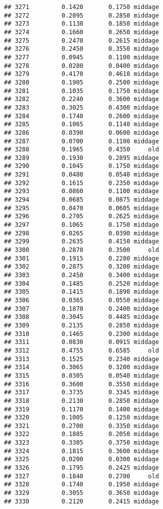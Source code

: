 \documentclass[
]{article}
\begin{document}
\begin{verbatim}
## 3271         0.1420       0.1750 middage
## 3272         0.2095       0.2850 middage
## 3273         0.1130       0.1850 middage
## 3274         0.1660       0.2650 middage
## 3275         0.2470       0.2615 middage
## 3276         0.2450       0.3550 middage
## 3277         0.0945       0.1100 middage
## 3278         0.0280       0.0400 middage
## 3279         0.4170       0.4610 middage
## 3280         0.1905       0.2500 middage
## 3281         0.1035       0.1750 middage
## 3282         0.2240       0.3600 middage
## 3283         0.3025       0.4300 middage
## 3284         0.1740       0.2600 middage
## 3285         0.1065       0.1140 middage
## 3286         0.0390       0.0600 middage
## 3287         0.0700       0.1100 middage
## 3288         0.1965       0.4350     old
## 3289         0.1930       0.2895 middage
## 3290         0.1045       0.1750 middage
## 3291         0.0480       0.0540 middage
## 3292         0.1615       0.2350 middage
## 3293         0.0860       0.1100 middage
## 3294         0.0685       0.0875 middage
## 3295         0.0470       0.0605 middage
## 3296         0.2705       0.2625 middage
## 3297         0.1065       0.1750 middage
## 3298         0.0265       0.0390 middage
## 3299         0.2635       0.4150 middage
## 3300         0.2870       0.3500     old
## 3301         0.1915       0.2200 middage
## 3302         0.2875       0.3200 middage
## 3303         0.2450       0.3400 middage
## 3304         0.1485       0.2520 middage
## 3305         0.1415       0.1890 middage
## 3306         0.0365       0.0550 middage
## 3307         0.1870       0.2400 middage
## 3308         0.3045       0.4485 middage
## 3309         0.2135       0.2850 middage
## 3310         0.1465       0.2300 middage
## 3311         0.0830       0.0915 middage
## 3312         0.4755       0.6585     old
## 3313         0.1525       0.2340 middage
## 3314         0.3065       0.3200 middage
## 3315         0.0305       0.0540 middage
## 3316         0.3600       0.3550 middage
## 3317         0.3735       0.3345 middage
## 3318         0.2130       0.2850 middage
## 3319         0.1170       0.1400 middage
## 3320         0.1005       0.1250 middage
## 3321         0.2700       0.3350 middage
## 3322         0.1885       0.2050 middage
## 3323         0.3305       0.3750 middage
## 3324         0.1815       0.3600 middage
## 3325         0.0200       0.0300 middage
## 3326         0.1795       0.2425 middage
## 3327         0.1840       0.2700     old
## 3328         0.1740       0.1950 middage
## 3329         0.3055       0.3650 middage
## 3330         0.2120       0.2415 middage

\end{verbatim}
\end{document}
